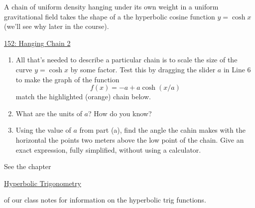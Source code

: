 \documentclass{ximera}
\begin{document}
\begin{question} \label{iifkdeyq3y}
A chain of uniform density hanging under its own weight in a uniform gravitational field takes the shape of a the hyperbolic cosine function $y=\cosh x$ (we'll see why later in the course).


\begin{onlineOnly}
    \begin{center}
\end{center}
\end{onlineOnly}

\href{https://www.desmos.com/calculator/iifkdeyq3y}{152: Hanging Chain 2}


\begin{enumerate} 


\item All that's needed to describe a particular chain is to scale the size of the curve $y=\cosh x$ by some factor. Test this by dragging the slider $a$ in Line 6 to make the graph of the function
\[
     f(x) = -a + a\cosh(x/a)
\]
match the highlighted (orange) chain below.

\item What are the units of $a$? How do you know?

\item Using the value of $a$ from part (a), find the angle the cahin makes with the horizontal the points two meters above the low point of the chain. Give an exact expression, fully simplified, without using a calculator.
\end{enumerate}

See the chapter

\href{https://ximera.osu.edu/calcone/Calculus1/HyperbolicTrig/HyperbolicTrig}{Hyperbolic Trigonometry}

of our class notes for information on the hyperbolic trig functions.

\end{question}
\end{document}
